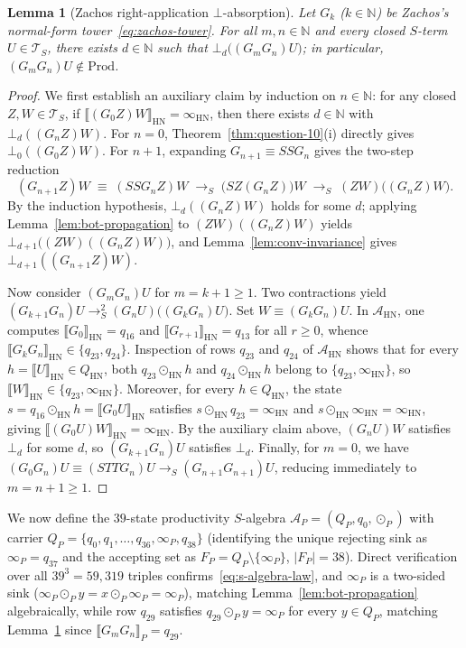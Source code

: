 \documentclass[11pt,reqno]{amsart}
\numberwithin{equation}{section}
\theoremstyle{plain}
\newtheorem{lemma}[theorem]{Lemma}
\theoremstyle{definition}
\theoremstyle{remark}
\newcommand{\TS}{\mathcal{T}_S}
\newcommand{\HN}{\mathrm{HN}}
\newcommand{\Prod}{\mathrm{Prod}}
\newcommand{\sem}[1]{\llbracket #1 \rrbracket}
\newcommand{\redS}{\to_S}
\begin{document}
\begin{lemma}[Zachos right-application $\bot$-absorption]\label{lem:zachos-bot-absorption}
Let $G_k$ ($k \in \mathbb{N}$) be Zachos's normal-form tower~\eqref{eq:zachos-tower}. For all $m, n \in \mathbb{N}$ and every closed $S$-term $U \in \TS$, there exists $d \in \mathbb{N}$ such that $\bot_d\bigl((G_m G_n) U\bigr)$; in particular, $(G_m G_n) U \notin \Prod$.
\end{lemma}

\begin{proof}
We first establish an auxiliary claim by induction on $n \in \mathbb{N}$: for any closed $Z, W \in \TS$, if $\sem{(G_0 Z) W}_{\HN} = \infty_{\HN}$, then there exists $d \in \mathbb{N}$ with $\bot_d((G_n Z) W)$. For $n = 0$, Theorem~\ref{thm:question-10}(i) directly gives $\bot_0((G_0 Z) W)$. For $n + 1$, expanding $G_{n+1} \equiv S S G_n$ gives the two-step reduction
\[
(G_{n+1} Z) W \;\equiv\; (S S G_n Z) W \;\redS\; \bigl(S Z (G_n Z)\bigr) W \;\redS\; (Z W)\bigl((G_n Z) W\bigr).
\]
By the induction hypothesis, $\bot_d((G_n Z) W)$ holds for some $d$; applying Lemma~\ref{lem:bot-propagation} to $(Z W)((G_n Z) W)$ yields $\bot_{d+1}\bigl((Z W)((G_n Z) W)\bigr)$, and Lemma~\ref{lem:conv-invariance} gives $\bot_{d+1}((G_{n+1} Z) W)$.

Now consider $(G_m G_n) U$ for $m = k + 1 \ge 1$. Two contractions yield $(G_{k+1} G_n) U \redS^2 (G_n U)\bigl((G_k G_n) U\bigr)$. Set $W \equiv (G_k G_n) U$. In $\mathcal{A}_{\HN}$, one computes $\sem{G_0}_{\HN} = q_{16}$ and $\sem{G_{r+1}}_{\HN} = q_{13}$ for all $r \ge 0$, whence $\sem{G_k G_n}_{\HN} \in \{q_{23}, q_{24}\}$. Inspection of rows $q_{23}$ and $q_{24}$ of $\mathcal{A}_{\HN}$ shows that for every $h = \sem{U}_{\HN} \in Q_{\HN}$, both $q_{23} \odot_{\HN} h$ and $q_{24} \odot_{\HN} h$ belong to $\{q_{23}, \infty_{\HN}\}$, so $\sem{W}_{\HN} \in \{q_{23}, \infty_{\HN}\}$. Moreover, for every $h \in Q_{\HN}$, the state $s = q_{16} \odot_{\HN} h = \sem{G_0 U}_{\HN}$ satisfies $s \odot_{\HN} q_{23} = \infty_{\HN}$ and $s \odot_{\HN} \infty_{\HN} = \infty_{\HN}$, giving $\sem{(G_0 U) W}_{\HN} = \infty_{\HN}$. By the auxiliary claim above, $(G_n U) W$ satisfies $\bot_d$ for some $d$, so $(G_{k+1} G_n) U$ satisfies $\bot_d$. Finally, for $m = 0$, we have $(G_0 G_n) U \equiv (S T T G_n) U \redS (G_{n+1} G_{n+1}) U$, reducing immediately to $m = n + 1 \ge 1$.
\end{proof}

We now define the $39$-state productivity $S$-algebra $\mathcal{A}_P = (Q_P, q_0, \odot_P)$ with carrier $Q_P = \{q_0, q_1, \dots, q_{36}, \infty_P, q_{38}\}$ (identifying the unique rejecting sink as $\infty_P = q_{37}$ and the accepting set as $F_P = Q_P \setminus \{\infty_P\}$, $|F_P| = 38$). Direct verification over all $39^3 = 59{,}319$ triples confirms~\eqref{eq:s-algebra-law}, and $\infty_P$ is a two-sided sink ($\infty_P \odot_P y = x \odot_P \infty_P = \infty_P$), matching Lemma~\ref{lem:bot-propagation} algebraically, while row $q_{29}$ satisfies $q_{29} \odot_P y = \infty_P$ for every $y \in Q_P$, matching Lemma~\ref{lem:zachos-bot-absorption} since $\sem{G_m G_n}_P = q_{29}$.
\end{document}

